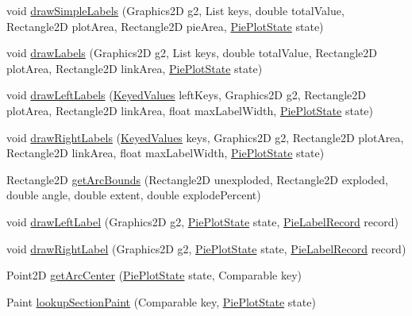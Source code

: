 \begin{DoxyCompactItemize}
void \mbox{\hyperlink{classorg_1_1jfree_1_1chart_1_1plot_1_1_pie_plot_a131c40d8daa0f81ba753d074f6818e4d}{draw\+Simple\+Labels}} (Graphics2D g2, List keys, double total\+Value, Rectangle2D plot\+Area, Rectangle2D pie\+Area, \mbox{\hyperlink{classorg_1_1jfree_1_1chart_1_1plot_1_1_pie_plot_state}{Pie\+Plot\+State}} state)
\item 
void \mbox{\hyperlink{classorg_1_1jfree_1_1chart_1_1plot_1_1_pie_plot_aa0fead93ce9bb3c7afaeb63fb46f29da}{draw\+Labels}} (Graphics2D g2, List keys, double total\+Value, Rectangle2D plot\+Area, Rectangle2D link\+Area, \mbox{\hyperlink{classorg_1_1jfree_1_1chart_1_1plot_1_1_pie_plot_state}{Pie\+Plot\+State}} state)
\item 
void \mbox{\hyperlink{classorg_1_1jfree_1_1chart_1_1plot_1_1_pie_plot_a99c4eedcf2d7d0667196e0f7d5614ded}{draw\+Left\+Labels}} (\mbox{\hyperlink{interfaceorg_1_1jfree_1_1data_1_1_keyed_values}{Keyed\+Values}} left\+Keys, Graphics2D g2, Rectangle2D plot\+Area, Rectangle2D link\+Area, float max\+Label\+Width, \mbox{\hyperlink{classorg_1_1jfree_1_1chart_1_1plot_1_1_pie_plot_state}{Pie\+Plot\+State}} state)
\item 
void \mbox{\hyperlink{classorg_1_1jfree_1_1chart_1_1plot_1_1_pie_plot_a64a1eefbf6318fd35617cba4d4f2b339}{draw\+Right\+Labels}} (\mbox{\hyperlink{interfaceorg_1_1jfree_1_1data_1_1_keyed_values}{Keyed\+Values}} keys, Graphics2D g2, Rectangle2D plot\+Area, Rectangle2D link\+Area, float max\+Label\+Width, \mbox{\hyperlink{classorg_1_1jfree_1_1chart_1_1plot_1_1_pie_plot_state}{Pie\+Plot\+State}} state)
\item 
Rectangle2D \mbox{\hyperlink{classorg_1_1jfree_1_1chart_1_1plot_1_1_pie_plot_a4150859d588970b7c12ebce9583eb062}{get\+Arc\+Bounds}} (Rectangle2D unexploded, Rectangle2D exploded, double angle, double extent, double explode\+Percent)
\item 
void \mbox{\hyperlink{classorg_1_1jfree_1_1chart_1_1plot_1_1_pie_plot_a14ae45fbfce06f6db125e454d8d8fb78}{draw\+Left\+Label}} (Graphics2D g2, \mbox{\hyperlink{classorg_1_1jfree_1_1chart_1_1plot_1_1_pie_plot_state}{Pie\+Plot\+State}} state, \mbox{\hyperlink{classorg_1_1jfree_1_1chart_1_1plot_1_1_pie_label_record}{Pie\+Label\+Record}} record)
\item 
void \mbox{\hyperlink{classorg_1_1jfree_1_1chart_1_1plot_1_1_pie_plot_af25aa7158690440928871d8bb477782c}{draw\+Right\+Label}} (Graphics2D g2, \mbox{\hyperlink{classorg_1_1jfree_1_1chart_1_1plot_1_1_pie_plot_state}{Pie\+Plot\+State}} state, \mbox{\hyperlink{classorg_1_1jfree_1_1chart_1_1plot_1_1_pie_label_record}{Pie\+Label\+Record}} record)
\item 
Point2D \mbox{\hyperlink{classorg_1_1jfree_1_1chart_1_1plot_1_1_pie_plot_a61570b1daf31d7b3b3534a27e3ab3174}{get\+Arc\+Center}} (\mbox{\hyperlink{classorg_1_1jfree_1_1chart_1_1plot_1_1_pie_plot_state}{Pie\+Plot\+State}} state, Comparable key)
\item 
Paint \mbox{\hyperlink{classorg_1_1jfree_1_1chart_1_1plot_1_1_pie_plot_afec6ac8c24d4037de8b80f5b5c4c3afc}{lookup\+Section\+Paint}} (Comparable key, \mbox{\hyperlink{classorg_1_1jfree_1_1chart_1_1plot_1_1_pie_plot_state}{Pie\+Plot\+State}} state)
\end{DoxyCompactItemize}
